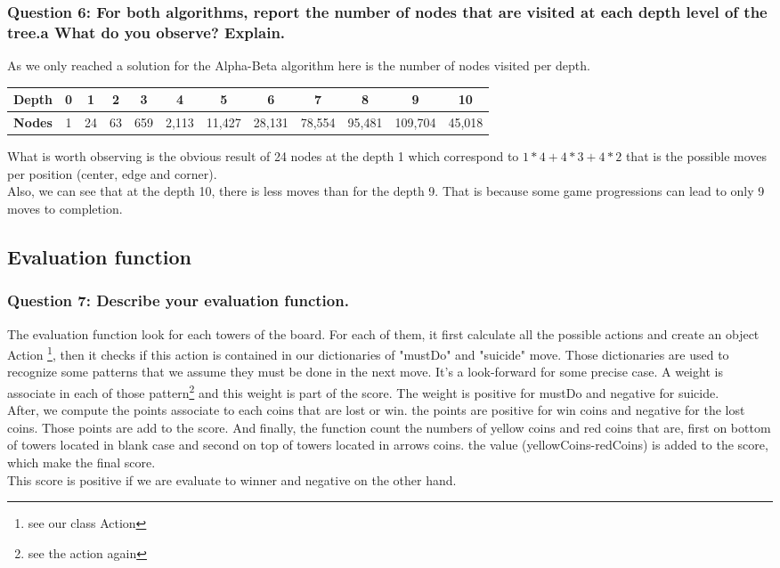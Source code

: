 \documentclass[a4paper,10pt]{article}
\begin{document}
			\subsubsection{Question 6: For both algorithms, report the number of nodes that are visited at each depth level of the tree.a What do you observe? Explain.}
				As we only reached a solution for the Alpha-Beta algorithm here is the number of nodes visited per depth.\\
				\begin{center}
					\begin{tabular}{|c|c|c|c|c|c|c|c|c|c|c|c|}
						\hline 
						\textbf{Depth} & 0 & 1 & 2 & 3 & 4 & 5 & 6 & 7 & 8 & 9 & 10 \\ 
						\hline 
						\textbf{Nodes} & 1 & 24 & 63 & 659 & 2,113 & 11,427 & 28,131 & 78,554 & 95,481 & 109,704 & 45,018 \\ 
						\hline 
					\end{tabular} 
				\end{center}
				What is worth observing is the obvious result of 24 nodes at the depth 1 which correspond to $ 1*4 + 4*3 + 4*2 $ that is the possible moves per position (center, edge and corner).\\
				Also, we can see that at the depth 10, there is less moves than for the depth 9. That is because some game progressions can lead to only 9 moves to completion.
			
			\subsection{Evaluation function}
				\subsubsection{Question 7: Describe your evaluation function.}
				The evaluation function look for each towers of the board. For each of them, it first calculate all the possible actions and create an object Action \footnote{see our class Action}, then it checks if this action is contained in our dictionaries of "mustDo" and "suicide" move. Those dictionaries are used to recognize some patterns that we assume they must be done in the next move. It's a look-forward for some precise case. A weight is associate in each of those pattern\footnote{see the action again} and this weight is part of the score. The weight is positive for mustDo and negative for suicide.\\
After, we compute the points associate to each coins that are lost or win. the points are positive for win coins and negative for the lost coins. Those points are add to the score.
And finally, the function count the numbers of yellow coins and red coins that are, first on bottom of towers located in blank case and second on top of towers located in arrows coins. the value (yellowCoins-redCoins) is added to the score, which make the final score.\\
This score is positive if we are evaluate to winner and negative on the other hand.
\end{document}
